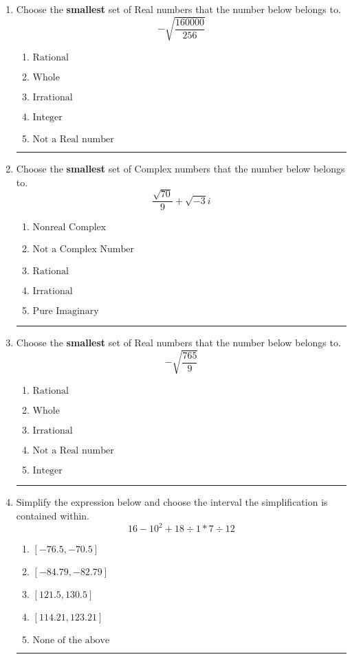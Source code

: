 \documentclass[14pt]{extbook}
\newcommand{\litem}[1]{\item#1\hspace*{-1cm}\rule{\textwidth}{0.4pt}}
\begin{document}
\begin{enumerate}
\litem{
Choose the \textbf{smallest} set of Real numbers that the number below belongs to.\[ -\sqrt{\frac{160000}{256}} \]\begin{enumerate}[label=\Alph*.]
\item \( \text{Rational} \)
\item \( \text{Whole} \)
\item \( \text{Irrational} \)
\item \( \text{Integer} \)
\item \( \text{Not a Real number} \)

\end{enumerate} }
\litem{
Choose the \textbf{smallest} set of Complex numbers that the number below belongs to.\[ \frac{\sqrt{70}}{9}+\sqrt{-3}i \]\begin{enumerate}[label=\Alph*.]
\item \( \text{Nonreal Complex} \)
\item \( \text{Not a Complex Number} \)
\item \( \text{Rational} \)
\item \( \text{Irrational} \)
\item \( \text{Pure Imaginary} \)

\end{enumerate} }
\litem{
Choose the \textbf{smallest} set of Real numbers that the number below belongs to.\[ -\sqrt{\frac{765}{9}} \]\begin{enumerate}[label=\Alph*.]
\item \( \text{Rational} \)
\item \( \text{Whole} \)
\item \( \text{Irrational} \)
\item \( \text{Not a Real number} \)
\item \( \text{Integer} \)

\end{enumerate} }
\litem{
Simplify the expression below and choose the interval the simplification is contained within.\[ 16 - 10^2 + 18 \div 1 * 7 \div 12 \]\begin{enumerate}[label=\Alph*.]
\item \( [-76.5, -70.5] \)
\item \( [-84.79, -82.79] \)
\item \( [121.5, 130.5] \)
\item \( [114.21, 123.21] \)
\item \( \text{None of the above} \)


\end{enumerate}}
\end{enumerate}
\end{document}
